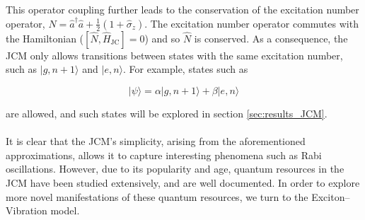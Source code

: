 \documentclass[12pt]{article}
\begin{document}
This operator coupling further leads to the conservation of the excitation number operator, $\hat{N} = \hat{a}^\dagger \hat{a} + \frac{1}{2}(1 + \hat{\sigma}_z)$. The excitation number operator commutes with the Hamiltonian ($[\hat{N}, \hat{H}_{\scriptscriptstyle \text{JC}}] = 0$) and so $\hat{N}$ is conserved. As a consequence, the JCM only allows transitions between states with the same excitation number, such as $|g, n+1\rangle$ and $|e,n\rangle$. For example, states such as

\begin{equation} \label{JCM_general_state}
    |\psi\rangle = \alpha|g,n+1\rangle + \beta|e,n\rangle
\end{equation} 

are allowed, and such states will be explored in section \ref{sec:results_JCM}.\\
\\
It is clear that the JCM's simplicity, arising from the aforementioned approximations, allows it to capture interesting phenomena such as Rabi oscillations. However, due to its popularity and age, quantum resources in the JCM have been studied extensively, and are well documented. In order to explore more novel manifestations of these quantum resources, we turn to the Exciton--Vibration model. 

\end{document}
